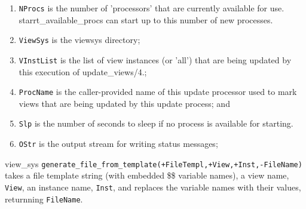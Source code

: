 \begin{description}
\begin{enumerate}
\begin{itemize}
\item {\tt ShCmd} is the shell command that was used to start the process.

\item {\tt SStr} is the output stream of the process's stdout and stderr file.

\item {\tt FileOut} is the name of the file connected to the stdout/stderr stream.

\item {\tt Datime} is the datime that the process was started.

\item {\tt View} is the view the process is generating.

\item @var(File) is the name of the output file to contain the
contents of the view instance.

\item {\tt Inst} is the instance of the view the process is generating.

\end{itemize}

\item {\tt NProcs} is the number of 'processors' that are currently
available for use.  starrt\_available\_procs can start up to this number
of new processes.

\item {\tt ViewSys} is the viewsys directory;

\item {\tt VInstList} is the list of view instances (or 'all') that are
being updated by this execution of update\_views/4.;

\item {\tt ProcName} is the caller-provided name of this update
processor used to mark views that are being updated by this update
process; and

\item {\tt Slp} is the number of seconds to sleep if no process is
available for starting.

\item {\tt OStr} is the output stream for writing status messages;

\end{enumerate}

{view\_sys}
%
{\tt generate\_file\_from\_template(+FileTempl,+View,+Inst,-FileName)}
takes a file template string (with embedded \$\$ variable names), a view
name, {\tt View}, an instance name, {\tt Inst}, and replaces the
variable names with their values, returnning {\tt FileName}.


\end{description}

